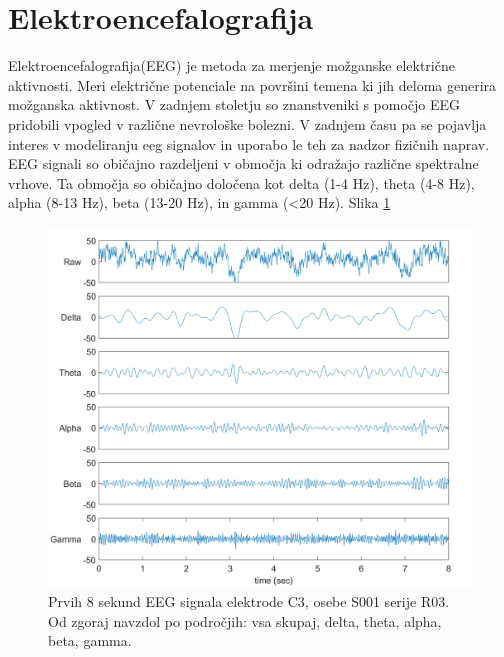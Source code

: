 \section{Elektroencefalografija}
Elektroencefalografija(EEG) je metoda za merjenje možganske električne aktivnosti. Meri električne potenciale na površini temena ki jih deloma generira možganska aktivnost. V zadnjem stoletju so znanstveniki s pomočjo EEG pridobili vpogled v različne nevrološke bolezni. V zadnjem času pa se pojavlja interes v modeliranju eeg signalov in uporabo le teh za nadzor fizičnih naprav. EEG signali so običajno razdeljeni v območja ki odražajo različne spektralne vrhove. Ta območja so običajno določena kot delta (1-4 Hz), theta (4-8 Hz), alpha (8-13 Hz), beta (13-20 Hz), in gamma (<20 Hz). Slika \ref{slika:eeg}
 \cite{nunezElectroencephalographyEEGNeurophysics2016}
 \begin{figure}[h]
    \begin{center}
    \includegraphics[width=1\linewidth]{slike/EEGSignals.png}
    \end{center}
    \caption{Prvih 8 sekund EEG signala elektrode C3, osebe S001 serije R03. Od zgoraj navzdol po področjih: vsa skupaj, delta, theta, alpha, beta, gamma.}
    \label{slika:eeg}
    \end{figure}


